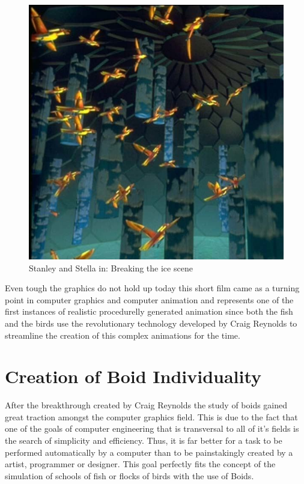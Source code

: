\documentclass[sigconf]{acmart}
\begin{document}
\begin{figure}[h]
  \centering
  \includegraphics[width=\linewidth]{images/stanley-and-stella-in-breaking-the-ice.jpg}
  \caption{Stanley and Stella in: Breaking the ice\cite{StanleyStella1987} scene}
  \label{fig:StanleyStellaBoids}
\end{figure}

Even tough the graphics do not hold up today this short film came as a turning point
in computer graphics and computer animation and represents one of the first instances
of realistic procedurelly generated animation since both the fish and the birds use
the revolutionary technology developed by Craig Reynolds to streamline the creation
of this complex animations for the time.

\section{Creation of Boid Individuality}

After the breakthrough created by Craig Reynolds the study of boids gained great
traction amongst the computer graphics field. This is due to the fact that
one of the goals of computer engineering that is transversal to all of it's fields is
the search of simplicity and efficiency. Thus, it is far better for a task to be
performed automatically by a computer than to be painstakingly created by a artist,
programmer or designer. This goal perfectly fits the concept of the simulation of schools
of fish or flocks of birds with the use of Boids.
\end{document}
